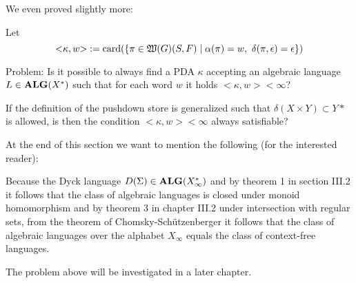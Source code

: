 We even proved slightly more:

Let \[ {<}\kappa, w{>} := \mathrm{card}({\mbox{$\{\pi \in \mbox{$\mathfrak{W}({G})$}(S,F) \mid \alpha(\pi)
= w,\ \delta(\pi, \epsilon) = \epsilon\}$}}) \]

Problem: Is it possible to always find a PDA $\kappa$ accepting an algebraic
language $L \in \mbox{{\bf ALG}}(X^*)$ such that for each word $w$ it holds 
${<}\kappa, w{>} < \infty$?

If the definition of the pushdown store is generalized such that $\delta(X
\times Y) \subset Y*$ is allowed, is then the condition ${<}\kappa, w{>} <
\infty$ always satisfiable?

At the end of this section we want to mention the following (for the interested
reader):

Because the Dyck language $D(\Sigma) \in \mbox{{\bf ALG}}(X_\infty^*)$ and by theorem 1
in section III.2 it follows that the class of algebraic languages is closed
under monoid homomorphism and by theorem 3 in chapter III.2 under intersection 
with regular sets, from the theorem of Chomsky-Schützenberger it follows that
the class of algebraic languages over the alphabet $X_\infty$ equals the class 
of context-free languages.

The problem above will be investigated in a later chapter.
